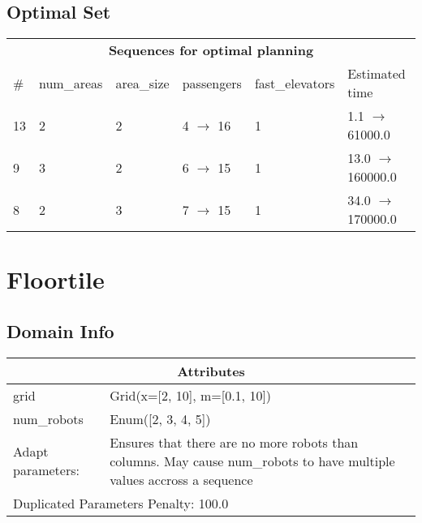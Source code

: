 \documentclass{article}
\begin{document}
                            \subsection*{Optimal Set}

                            \begin{center}
                            \begin{tabular}{l|l|l|l|l|l}
                            \multicolumn{6}{c}{\bf \large Sequences for optimal planning}\\
                            \# & num\_areas & area\_size & passengers & fast\_elevators & Estimated time\\\midrule
                            13&2&2&4 $\rightarrow$ 16&1&1.1 $\rightarrow$ 61000.0\\
9&3&2&6 $\rightarrow$ 15&1&13.0 $\rightarrow$ 160000.0\\
8&2&3&7 $\rightarrow$ 15&1&34.0 $\rightarrow$ 170000.0
                            \end{tabular}
                            \end{center}
                    \newpage \section{Floortile}
                    \subsection*{Domain Info}

                    \begin{center}
                    \begin{tabular}{p{}p{}}
                    \multicolumn{2}{c}{\bf \large Attributes}\\\midrule
                    grid & Grid(x=[2, 10], m=[0.1, 10])\\
num\_robots & Enum([2, 3, 4, 5])
                    
                    \\\midrule
                    Adapt parameters: & Ensures that there are no more robots than columns. May cause num\_robots to have multiple values accross a sequence  
                
                     \\\midrule
                    \multicolumn{2}{l}{Duplicated Parameters Penalty: 100.0}
                    \end{tabular}
                    \end{center}
                
\end{document}

